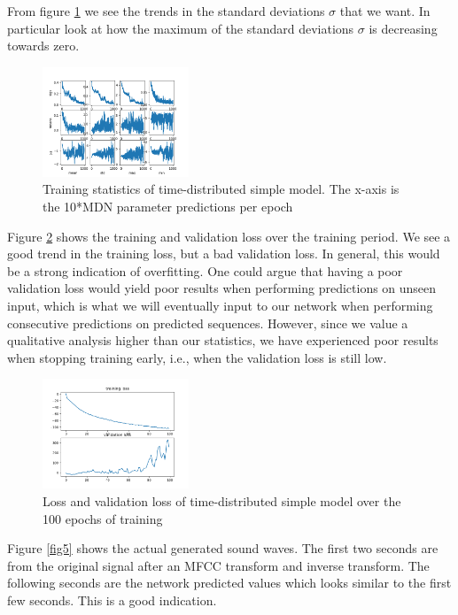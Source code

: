 \documentclass[conference]{IEEEtran}
\begin{document}
From figure \ref{fig3} we see the trends in the standard deviations \boldmath$\sigma$ that we want. In particular look at how the maximum of the standard deviations $\sigma$ is decreasing towards zero. \unboldmath

\begin{figure}[ht] 
  \centering %
  \includegraphics[width=0.39\textwidth]{./best/BEST2_train_stats.png} 
  \caption{Training statistics of time-distributed simple model. The x-axis is the 10*MDN parameter predictions per epoch}
  \label{fig3} 
\end{figure}

Figure \ref{fig4} shows the training and validation loss over the training period. We see a good trend in the training loss, but a bad validation loss. In general, this would be a strong indication of overfitting. One could argue that having a poor validation loss would yield poor results when performing predictions on unseen input, which is what we will eventually input to our network when performing consecutive predictions on predicted sequences. However, since we value a qualitative analysis higher than our statistics, we have experienced poor results when stopping training early, i.e., when the validation loss is still low. 

\begin{figure}[ht] 
  \centering %
  \includegraphics[width=0.39\textwidth]{./best/BEST2_loss.png} 
  \caption{Loss and validation loss of time-distributed simple model over the 100 epochs of training}
  \label{fig4} 
\end{figure}

Figure \ref{fig5} shows the actual generated sound waves. The first two seconds are from the original signal after an MFCC transform and inverse transform. The following seconds are the network predicted values which looks similar to the first few seconds. This is a good indication.
\end{document}
